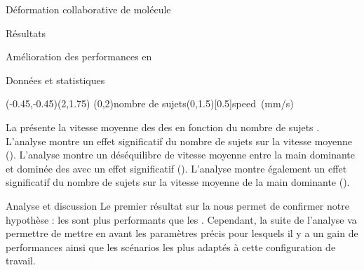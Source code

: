 \documentclass[myfrancais,ngerman,english,frenchb]{mythesis}
\begin{document}
\begin{mychapter}{Déformation collaborative de molécule}
\begin{mysection}{Résultats}
\begin{mysubsection}{Amélioration des performances en }
\begin{mysubsubsection}{Données et statistiques}
					\begin{myfigure}
						\begin{myps}(-0.45,-0.45)(2,1.75)
							\myaxes(0,2){nombre de sujets}(0,1.5)[0.5]{speed~(mm/s)}
						\end{myps}
					\end{myfigure}

					La  présente la vitesse moyenne des   des  en fonction du nombre de sujets .
					L'analyse montre un effet significatif du nombre de sujets  sur la vitesse moyenne  ().
					L'analyse montre un déséquilibre de vitesse moyenne entre la main dominante et dominée des  avec un effet significatif ().
					L'analyse montre également un effet significatif du nombre de sujets  sur la vitesse moyenne  de la main dominante ().
				\end{mysubsubsection}
				\begin{mysubsubsection}{Analyse et discussion}
					Le premier résultat sur la  nous permet de confirmer notre hypothèse  : les  sont plus performants que les .
					Cependant, la suite de l'analyse va permettre de mettre en avant les paramètres précis pour lesquels il y a un gain de performances ainsi que les scénarios les plus adaptés à cette configuration de travail.


\end{mysubsubsection}
\end{mysubsection}
\end{mysection}
\end{mychapter}
\end{document}
